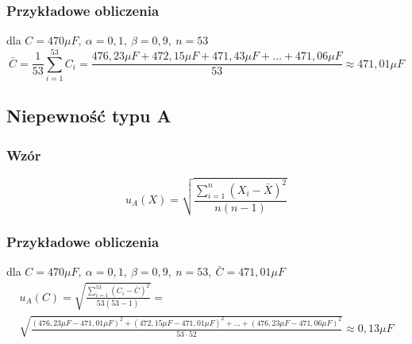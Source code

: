 \documentclass[12pt]{mwart}
\begin{document}
	\subsubsection{Przykładowe obliczenia}
	dla $C=470\mu F, \ \alpha=0,1, \ \beta=0,9, \ n=53$
	\begin{equation}
		\bar C = \frac{1}{53}\sum\limits_{i=1}^{53} C_{i}=\frac{476,23\mu F+472,15\mu F+471,43\mu F+\dots +471,06\mu F}{53}\approx471,01\mu F
	\end{equation}
	\subsection{Niepewność typu A}
	\subsubsection{Wzór}
	\begin{equation}
		u_{A}\left(X\right)=\sqrt{\frac{\sum\limits_{i=1}^{n}{\left(X_{i}-\bar X\right)}^2}{n\left(n-1\right)}}
	\end{equation}
	\subsubsection{Przykładowe obliczenia}
	dla $C=470\mu F, \ \alpha=0,1, \ \beta=0,9, \ n=53, \ \bar C=471,01\mu F$
	\begin{multline}
		u_{A}\left(C\right)=\sqrt{\frac{\sum\limits_{i=1}^{53}{\left(C_{i}-\bar C\right)}^2}{53\left(53-1\right)}}=\\ \sqrt{\frac{{\left(476,23\mu F-471,01\mu F\right)}^2+{\left(472,15\mu F-471,01\mu F\right)}^2+\dots +{\left(476,23\mu F-471,06\mu F\right)}^2}{53\cdot 52}}\approx0,13\mu F
	\end{multline}
\end{document}
